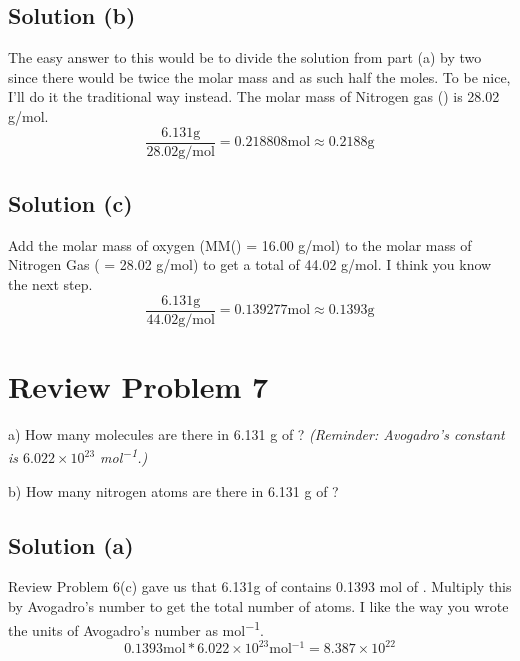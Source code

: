 \documentclass[10pt]{article}
\begin{document}
        \subsection{Solution (b)}
            The easy answer to this would be to divide the solution from part (a) by two since there would be twice the molar mass and as such half the moles.
            To be nice, I'll do it the traditional way instead.
            The molar mass of Nitrogen gas () is 28.02 \unit{\gram/\mol}.
            \begin{equation}
                \frac{6.131 \unit{\gram}}{28.02 \unit{\gram/\mol}} = 0.218808 \unit{\mol}   \approx \boxed{0.2188 \unit{\gram}}
            \end{equation} 

        \subsection{Solution (c)}
            Add the molar mass of oxygen (MM() = 16.00 \unit{\gram/\mol}) to the molar mass of Nitrogen Gas ( = 28.02 \unit{\gram/\mol}) to get a total of 44.02 \unit{\gram/\mol}.
            I think you know the next step.
            \begin{equation}
                \frac{6.131 \unit{\gram}}{44.02 \unit{\gram/\mol}} = 0.139277 \unit{\mol} \approx   \boxed{0.1393 \unit{\gram}}
            \end{equation}
    
    \pagebreak
    \section{Review Problem 7}
        a) How many  molecules are there in 6.131 g of ? \textit{(Reminder: Avogadro's constant is $6.022 \times 10^{23}$ \unit{\mol^{-1}}.)} 
        
        \noindent
        b) How many nitrogen atoms are there in 6.131 g of ?

        \subsection{Solution (a)}
            Review Problem 6(c) gave us that 6.131g of  contains 0.1393 \unit{\mol} of .
            Multiply this by Avogadro's number to get the total number of atoms.
            I like the way you wrote the units of Avogadro's number as \unit{\mol^{-1}}. 
            \begin{equation}
                0.1393 \unit{\mol} * 6.022 \times 10^{23} \unit{\mol^{-1}} = \boxed{8.387 \times 10^{22}}
            \end{equation}
\end{document}
